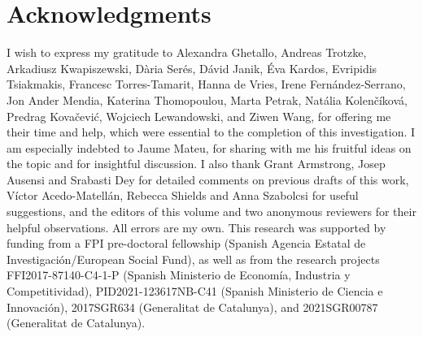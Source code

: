 \documentclass[output=paper,colorlinks,citecolor=brown]{langscibook}
\begin{document}
\section*{Acknowledgments}
I wish to express my gratitude to Alexandra Ghetallo, Andreas Trotzke, Arkadiusz Kwapiszewski, Dària Serés, Dávid Janik, Éva Kardos, Evripidis Tsiakmakis, Francesc Torres-Tamarit, Hanna de Vries, Irene Fernández-Serrano, Jon Ander Mendia, Katerina Thomopoulou, Marta Petrak, Natália Kolenčíková, Predrag Kovačević, Wojciech Lewandowski, and Ziwen Wang, for offering me their time and help, which were essential to the completion of this investigation. I am especially indebted to Jaume Mateu, for sharing with me his fruitful ideas on the topic and for insightful discussion. I also thank Grant Armstrong, Josep Ausensi and Srabasti Dey for detailed comments on previous drafts of this work, Víctor Acedo-Matellán, Rebecca Shields and Anna Szabolcsi for useful suggestions, and the editors of this volume and two anonymous reviewers for their helpful observations. All errors are my own. This research was supported by funding from a FPI pre-doctoral fellowship (Spanish Agencia Estatal de Investigación/European Social Fund), as well as from the research projects FFI2017-87140-C4-1-P (Spanish Ministerio de Economía, Industria y Competitividad), PID2021-123617NB-C41 (Spanish Ministerio de Ciencia e Innovación), 2017SGR634 (Generalitat de Catalunya), and 2021SGR00787 (Generalitat de Catalunya).


\printbibliography[heading=subbibliography,notkeyword=this]
\end{document}
